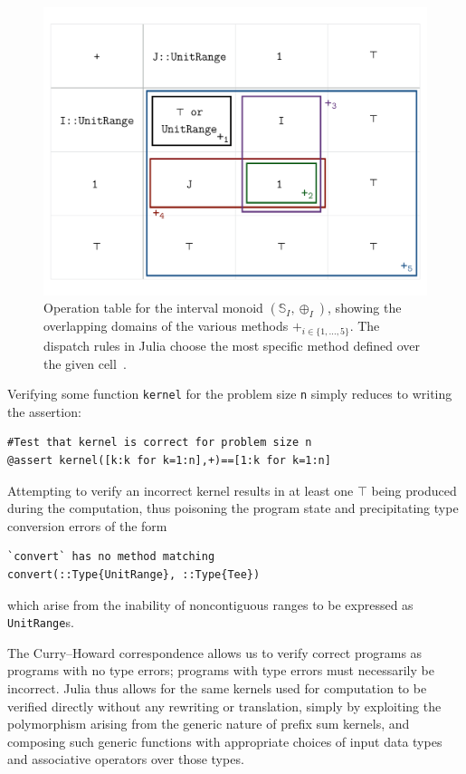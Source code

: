 \documentclass{sig-alternate}
\newcommand{\code}[1]{\texttt{#1}}
\begin{document}
\begin{figure}
  \centering
  \includegraphics[width=.9\columnwidth]{intervaldispatch}
  \caption{Operation table for the interval monoid $(\mathbb S_I, \oplus_I)$,
	  showing the overlapping domains of the various methods
	  $+_{i\in\{1,\dots,5\}}$. The dispatch rules in Julia choose the most
  	  specific method defined over the given cell~\cite{Bezanson2012}.}
  \label{fig:dispatch}
\end{figure}

Verifying some function \code{kernel} for the problem size \code{n} simply
reduces to writing the assertion:

\begin{verbatim}
#Test that kernel is correct for problem size n
@assert kernel([k:k for k=1:n],+)==[1:k for k=1:n]
\end{verbatim}

Attempting to verify an incorrect kernel results in at least one $\top$ being
produced during the computation, thus poisoning the program state and
precipitating type conversion errors of the form

\begin{verbatim}
`convert` has no method matching
convert(::Type{UnitRange}, ::Type{Tee})
\end{verbatim}
%
which arise from the inability of noncontiguous ranges to be expressed as
\code{UnitRange}s. 

The Curry--Howard correspondence allows us to verify correct programs as
programs with no type errors; programs with type errors must necessarily be
incorrect. Julia thus allows for the same kernels used for computation to be
verified directly without any rewriting or translation, simply by exploiting
the polymorphism arising from the generic nature of prefix sum kernels, and
composing such generic functions with appropriate choices of input data types
and associative operators over those types.
\end{document}
